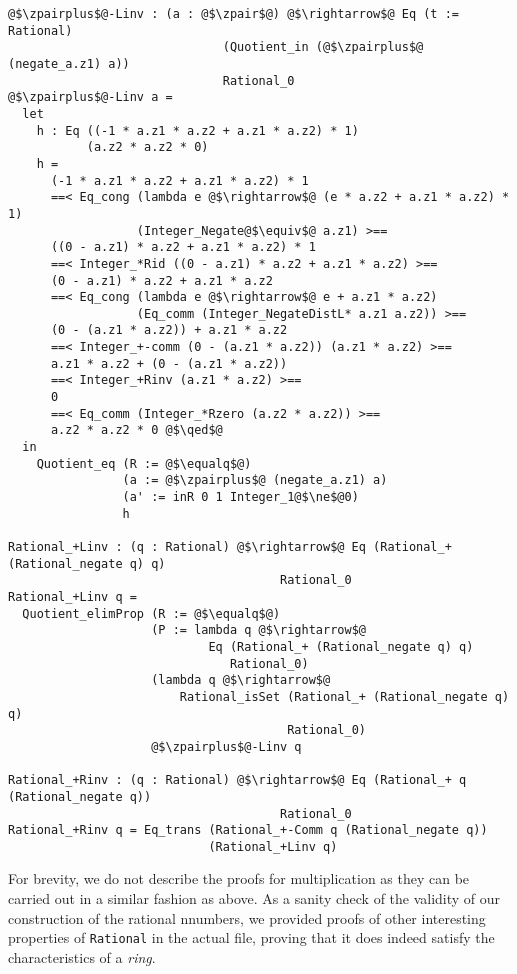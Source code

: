 \documentclass[12pt,twoside,maitrise]{dms}
\theoremstyle{definition}
\numberwithin{equation}{section}
\numberwithin{table}{chapter}
\numberwithin{figure}{chapter}
\newcommand\id[1] {\texttt{#1}}
\renewcommand\qed{\blacksquare}
\begin{document}
\begin{verbatim}
@$\zpairplus$@-Linv : (a : @$\zpair$@) @$\rightarrow$@ Eq (t := Rational)
                              (Quotient_in (@$\zpairplus$@ (negate_a.z1) a))
                              Rational_0
@$\zpairplus$@-Linv a =
  let
    h : Eq ((-1 * a.z1 * a.z2 + a.z1 * a.z2) * 1)
           (a.z2 * a.z2 * 0)
    h =
      (-1 * a.z1 * a.z2 + a.z1 * a.z2) * 1
      ==< Eq_cong (lambda e @$\rightarrow$@ (e * a.z2 + a.z1 * a.z2) * 1)
                  (Integer_Negate@$\equiv$@ a.z1) >==
      ((0 - a.z1) * a.z2 + a.z1 * a.z2) * 1
      ==< Integer_*Rid ((0 - a.z1) * a.z2 + a.z1 * a.z2) >==
      (0 - a.z1) * a.z2 + a.z1 * a.z2
      ==< Eq_cong (lambda e @$\rightarrow$@ e + a.z1 * a.z2)
                  (Eq_comm (Integer_NegateDistL* a.z1 a.z2)) >==
      (0 - (a.z1 * a.z2)) + a.z1 * a.z2
      ==< Integer_+-comm (0 - (a.z1 * a.z2)) (a.z1 * a.z2) >==
      a.z1 * a.z2 + (0 - (a.z1 * a.z2))
      ==< Integer_+Rinv (a.z1 * a.z2) >==
      0
      ==< Eq_comm (Integer_*Rzero (a.z2 * a.z2)) >==
      a.z2 * a.z2 * 0 @$\qed$@
  in
    Quotient_eq (R := @$\equalq$@)
                (a := @$\zpairplus$@ (negate_a.z1) a)
                (a' := inR 0 1 Integer_1@$\ne$@0)
                h

Rational_+Linv : (q : Rational) @$\rightarrow$@ Eq (Rational_+ (Rational_negate q) q)
                                      Rational_0
Rational_+Linv q =
  Quotient_elimProp (R := @$\equalq$@)
                    (P := lambda q @$\rightarrow$@
                            Eq (Rational_+ (Rational_negate q) q)
                               Rational_0)
                    (lambda q @$\rightarrow$@
                        Rational_isSet (Rational_+ (Rational_negate q) q)
                                       Rational_0)
                    @$\zpairplus$@-Linv q

Rational_+Rinv : (q : Rational) @$\rightarrow$@ Eq (Rational_+ q (Rational_negate q))
                                      Rational_0
Rational_+Rinv q = Eq_trans (Rational_+-Comm q (Rational_negate q))
                            (Rational_+Linv q)

\end{verbatim}

For brevity, we do not describe the proofs for multiplication as they can be
carried out in a similar fashion as above. As a sanity check of the validity of
our construction of the rational nnumbers, we provided proofs of other
interesting properties of \id{Rational} in the actual file, proving that it does
indeed satisfy the characteristics of a \emph{ring}.
\end{document}

